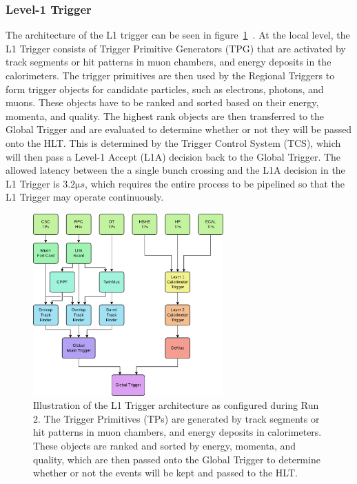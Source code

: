 \subsubsection{Level-1 Trigger}

The architecture of the L1 trigger can be seen in figure~\ref{fig:L1Trigger}~\cite{cmscollaboration2020performance}.
At the local level, the L1 Trigger consists of Trigger Primitive Generators (TPG) that are activated by track segments or hit patterns in muon chambers, and energy deposits in the calorimeters.
The trigger primitives are then used by the Regional Triggers to form trigger objects for candidate particles, such as electrons, photons, and muons.
These objects have to be ranked and sorted based on their energy, momenta, and quality.
The highest rank objects are then transferred to the Global Trigger and are evaluated to determine whether or not they will be passed onto the HLT.
This is determined by the Trigger Control System (TCS), which will then pass a Level-1 Accept (L1A) decision back to the Global Trigger.
The allowed latency between the a single bunch crossing and the L1A decision in the L1 Trigger is $3.2\unit{\micro s}$, which requires the entire process to be pipelined so that the L1 Trigger may operate continuously.

\begin{figure}[htbp]
  \centering
  \includegraphics[width=0.65\textwidth]{fig/experiment/cms_L1trigger.pdf}
  \caption{
    Illustration of the L1 Trigger architecture as configured during Run 2.
    The Trigger Primitives (TPs) are generated by track segments or hit patterns in muon chambers, and energy deposits in calorimeters.
    These objects are ranked and sorted by energy, momenta, and quality, which are then passed onto the Global Trigger to determine whether or not the events will be kept and passed to the HLT.
  }
  \label{fig:L1Trigger}
\end{figure}

